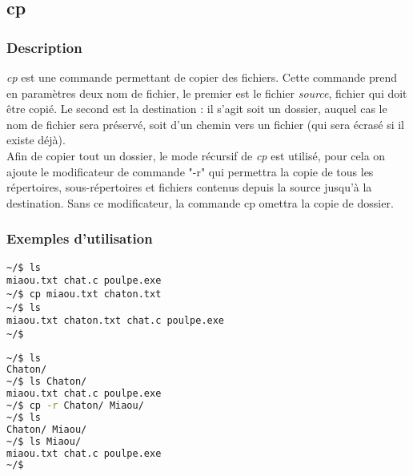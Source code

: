 \subsection*{cp}
\subsubsection*{Description}
\emph{cp} est une commande permettant de copier des fichiers.
Cette commande prend en paramètres deux nom de fichier, le premier est le fichier \emph{source}, fichier qui doit être copié. Le second est la destination : il s'agit soit un dossier, auquel cas le nom de fichier sera préservé, soit d'un chemin vers un fichier (qui sera écrasé si il existe déjà).\\
Afin de copier tout un dossier, le mode récursif de \emph{cp} est utilisé, pour cela on ajoute le modificateur de commande "-r" qui permettra la copie de tous les répertoires, sous-répertoires et fichiers contenus depuis la source jusqu'à la destination.
Sans ce modificateur, la commande cp omettra la copie de dossier.

\subsubsection*{Exemples d'utilisation}

\begin{lstlisting}[caption=copie de fichier]
~/$ ls
miaou.txt chat.c poulpe.exe
~/$ cp miaou.txt chaton.txt
~/$ ls
miaou.txt chaton.txt chat.c poulpe.exe
~/$
\end{lstlisting}

\begin{lstlisting}[language=bash,caption=copie de dossier]
~/$ ls
Chaton/
~/$ ls Chaton/
miaou.txt chat.c poulpe.exe
~/$ cp -r Chaton/ Miaou/
~/$ ls
Chaton/ Miaou/
~/$ ls Miaou/
miaou.txt chat.c poulpe.exe
~/$
\end{lstlisting}

